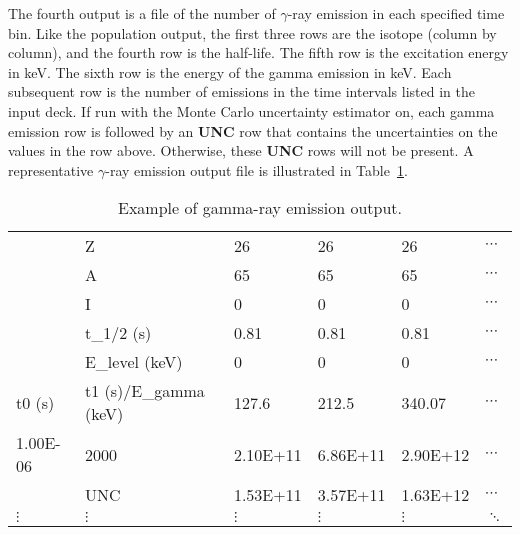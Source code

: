\documentclass{article}
\begin{document}
\begin{appendices}
\newpage
\noindent The fourth output is a file of the number of $\gamma$-ray emission in each specified time bin. Like the population output, the first three rows are the isotope (column by column), and the fourth row is the half-life. The fifth row is the excitation energy in keV. The sixth row is the energy of the gamma emission in keV. Each subsequent row is the number of emissions in the time intervals listed in the input deck. If run with the Monte Carlo uncertainty estimator on, each gamma emission row is followed by an \textbf{UNC} row that contains the uncertainties on the values in the row above. Otherwise, these \textbf{UNC} rows will not be present. A representative $\gamma$-ray emission output file is illustrated in Table~\ref{gammas}.

\begin{table}[h]
\centering
\begin{tabular}{llllll}

 & Z & 26 & 26 & 26 & $\cdots$ \\ 
 & A & 65 & 65 & 65 & $\cdots$ \\ 
 & I  & 0 & 0 & 0 & $\cdots$ \\ 
 & t\_1/2 (s) & 0.81 & 0.81 & 0.81 & $\cdots$ \\ 
 & E\_level (keV) & 0 & 0 & 0 & $\cdots$ \\ 
t0 (s) & t1 (s)/E\_gamma (keV) & 127.6 & 212.5 & 340.07 & $\cdots$ \\  
1.00E-06 & 2000 & 2.10E+11 & 6.86E+11 & 2.90E+12 & $\cdots$ \\ 
   & UNC & 1.53E+11 & 3.57E+11 & 1.63E+12 & $\cdots$ \\ 
$\vdots$ & $\vdots$ & $\vdots$ & $\vdots$ & $\vdots$ & $\ddots$ \\ 
\end{tabular}
\caption{Example of gamma-ray emission output.}
\label{gammas}
\end{table}
\end{appendices}
\end{document}
